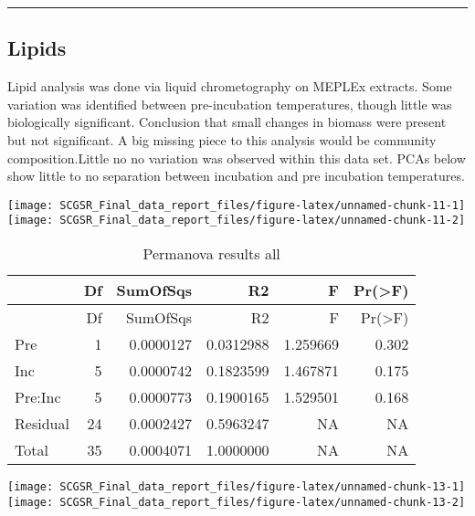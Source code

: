 \documentclass[
]{article}
\begin{document}
\begin{center}\rule{0.5\linewidth}{0.5pt}\end{center}

\hypertarget{lipids}{%
\subsection{Lipids}\label{lipids}}

Lipid analysis was done via liquid chrometography on MEPLEx extracts.
Some variation was identified between pre-incubation temperatures,
though little was biologically significant. Conclusion that small
changes in biomass were present but not significant. A big missing piece
to this analysis would be community composition.Little no no variation
was observed within this data set. PCAs below show little to no
separation between incubation and pre incubation temperatures.

\texttt{[image: SCGSR\_Final\_data\_report\_files/figure-latex/unnamed-chunk-11-1]}
\texttt{[image: SCGSR\_Final\_data\_report\_files/figure-latex/unnamed-chunk-11-2]}

\begin{longtable}[]{@{}lrrrrr@{}}
\caption{Permanova results all}\tabularnewline
\toprule\noalign{}
& Df & SumOfSqs & R2 & F & Pr(\textgreater F) \\
\midrule\noalign{}
\endfirsthead
\toprule\noalign{}
& Df & SumOfSqs & R2 & F & Pr(\textgreater F) \\
\midrule\noalign{}
\endhead
\bottomrule\noalign{}
\endlastfoot
Pre & 1 & 0.0000127 & 0.0312988 & 1.259669 & 0.302 \\
Inc & 5 & 0.0000742 & 0.1823599 & 1.467871 & 0.175 \\
Pre:Inc & 5 & 0.0000773 & 0.1900165 & 1.529501 & 0.168 \\
Residual & 24 & 0.0002427 & 0.5963247 & NA & NA \\
Total & 35 & 0.0004071 & 1.0000000 & NA & NA \\
\end{longtable}

\texttt{[image: SCGSR\_Final\_data\_report\_files/figure-latex/unnamed-chunk-13-1]}
\texttt{[image: SCGSR\_Final\_data\_report\_files/figure-latex/unnamed-chunk-13-2]}
\end{document}
